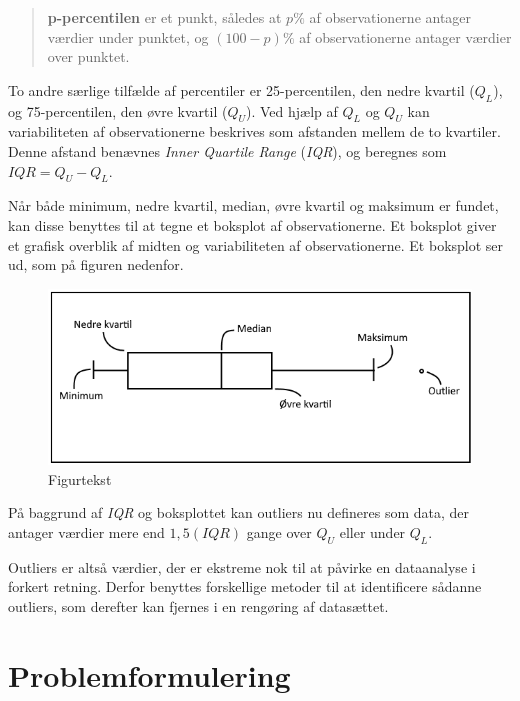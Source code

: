 \documentclass[]{book}
\theoremstyle{definition}
\theoremstyle{definition}
\theoremstyle{definition}
\theoremstyle{remark}
\let\BeginKnitrBlock\begin \let\EndKnitrBlock\end
\begin{document}
\begin{quote}
\BeginKnitrBlock{definition}
\protect\hypertarget{def:unnamed-chunk-3}{}{\label{def:unnamed-chunk-3} }\textbf{p-percentilen} er et punkt, således at \(p \%\) af observationerne antager værdier under punktet, og \((100 - p) \%\) af observationerne antager værdier over punktet.
\EndKnitrBlock{definition}
\end{quote}

To andre særlige tilfælde af percentiler er 25-percentilen, den nedre kvartil (\(Q_L\)), og 75-percentilen, den øvre kvartil (\(Q_U\)). Ved hjælp af \(Q_L\) og \(Q_U\) kan variabiliteten af observationerne beskrives som afstanden mellem de to kvartiler. Denne afstand benævnes \emph{Inner Quartile Range} (\emph{IQR}), og beregnes som \(IQR = Q_U - Q_L\).

Når både minimum, nedre kvartil, median, øvre kvartil og maksimum er fundet, kan disse benyttes til at tegne et boksplot af observationerne. Et boksplot giver et grafisk overblik af midten og variabiliteten af observationerne. Et boksplot ser ud, som på figuren nedenfor.

\begin{figure}

{\centering \includegraphics[width=0.75\linewidth]{images/Boksplot} 

}

\caption{Figurtekst}\label{fig:unnamed-chunk-4}
\end{figure}

På baggrund af \emph{IQR} og boksplottet kan outliers nu defineres som data, der antager værdier mere end \(1,5(IQR)\) gange over \(Q_U\) eller under \(Q_L\).

Outliers er altså værdier, der er ekstreme nok til at påvirke en dataanalyse i forkert retning. Derfor benyttes forskellige metoder til at identificere sådanne outliers, som derefter kan fjernes i en rengøring af datasættet.

\hypertarget{problemformulering}{%
\section{Problemformulering}\label{problemformulering}}
\end{document}
